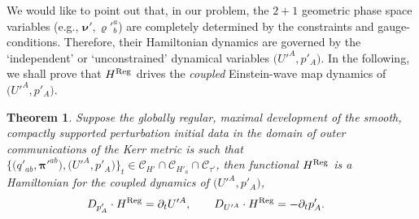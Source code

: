 \documentclass[pdftex]{sigma}
\def\ptl{\partial}%
\def\mbo#1{\boldsymbol{#1}}%
\numberwithin{equation}{section}
\newtheorem{Theorem}{Theorem}[section]
\begin{document}
We would like to point out that, in our problem, the $2+1$ geometric phase space variables \big(e.g., $\mbo{\nu}', \varrho'^a_b$\big) are completely determined by the constraints and gauge-conditions. Therefore, their Hamiltonian dynamics are governed by the `independent' or `unconstrained' dynamical variables $\bigl(U'^A, p'_A\bigr)$. In the following, we shall prove that $H^{{\rm Reg}}$ drives the \emph{coupled} Einstein-wave map dynamics of $\bigl(U'^A, p'_A\bigr)$.

\begin{Theorem}
Suppose the globally regular, maximal development of the smooth, compactly supported perturbation initial data in the domain of outer communications of the Kerr metric is such that $\bigl\{ \bigl(q'_{ab}, \mbo{\pi}'^{ab}\bigr), \bigl(U'^A, p'_A\bigr) \bigr\}_{t} \in \mathscr{C}_{H'} \cap \mathscr{C}_{H'_a} \cap \mathscr{C}_{\tau'}$, then functional $H^{{\rm Reg}}$ is a Hamiltonian for the coupled dynamics of $\bigl(U'^A, p'_A\bigr)$,
\begin{align*}
&D_{p'_A} \cdot H^{{\rm Reg}} = \ptl_t U'^A, \qquad
D_{U'^{A}} \cdot H^{{\rm Reg}} =- \ptl_t p'_A.
\end{align*}
\end{Theorem}
\end{document}
